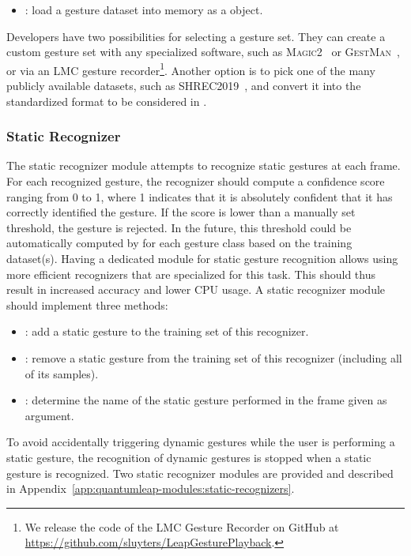 \begin{itemize}[noitemsep]
    \item {}: load a gesture dataset into memory as a  object.
\end{itemize}
Developers have two possibilities for selecting a gesture set. They can create a custom gesture set with any specialized software, such as \textsc{Magic2}~\cite{Kohlsdorf:2011} or \textsc{GestMan}~\cite{Magrofuoco:2019a}, or via an LMC gesture recorder\footnote{We release the code of the LMC Gesture Recorder on GitHub at \url{https://github.com/sluyters/LeapGesturePlayback}.}. Another option is to pick one of the many publicly available datasets, such as SHREC2019~\cite{Caputo:2019}, and convert it into the standardized format to be considered in \ql.

\subsubsection{Static Recognizer}
The static recognizer module attempts to recognize static gestures at each frame. For each recognized gesture, the recognizer should compute a confidence score ranging from 0 to 1, where 1 indicates that it is absolutely confident that it has correctly identified the gesture. If the score is lower than a manually set threshold, the gesture is rejected. In the future, this threshold could be automatically computed by \ql for each gesture class based on the training dataset(s). Having a dedicated module for static gesture recognition allows using more efficient recognizers that are specialized for this task. This should thus result in increased accuracy and lower CPU usage. A static recognizer module should implement three methods:
\begin{itemize}[noitemsep]
    \item {}: add a static gesture to the training set of this recognizer.
    \item {}: remove a static gesture from the training set of this recognizer (including all of its samples).
    \item {}: determine the name of the static gesture performed in the frame given as argument.
\end{itemize}
To avoid accidentally triggering dynamic gestures while the user is performing a static gesture, the recognition of dynamic gestures is stopped when a static gesture is recognized. Two static recognizer modules are provided and described in Appendix~\ref{app:quantumleap-modules:static-recognizers}.

